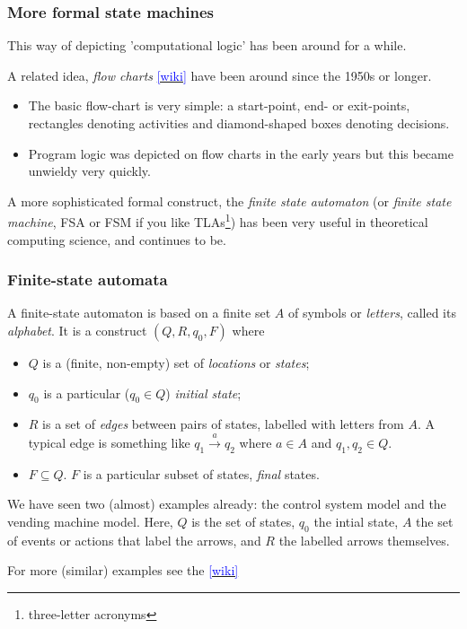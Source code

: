 \documentclass[10pt, hyperref={pdfpagelabels=false}]{beamer}
\begin{document}
\begin{frame}
\frametitle{More formal state machines}
This way of depicting 'computational logic' has been around for a while. 

A related idea, \emph{flow charts} \href{https://en.wikipedia.org/wiki/Flowchart}{\textcolor{blue}{[wiki]}} have been around since the 1950s or longer.
\begin{itemize}
\item The basic flow-chart is very simple: a start-point, end- or exit-points, rectangles denoting activities and diamond-shaped boxes denoting decisions.
\item Program logic was depicted on flow charts in the early years but this became unwieldy very quickly.
\end{itemize}

A more sophisticated formal construct, the \emph{finite state automaton} (or \emph{finite state machine}, FSA or FSM if you like TLAs\footnote{three-letter acronyms}) has been very useful in theoretical computing science, and continues to be.
\end{frame}

\begin{frame}
\frametitle{Finite-state automata}
A finite-state automaton is based on a finite set $A$ of symbols or \emph{letters}, called its \emph{alphabet}. It is a construct $(Q, R, q_0, F)$ where
\begin{itemize}
\item $Q$ is a (finite, non-empty) set of \emph{locations} or \emph{states};
\item $q_0$ is a particular ($q_0 \in Q$) \emph{initial state};
\item $R$ is a set of \emph{edges} between pairs of states, labelled with letters from $A$. A typical edge is something like $q_1 \stackrel{a}{\longrightarrow} q_2$ where $a \in A$ and $q_1, q_2 \in Q$.
\item $F \subseteq Q$. $F$ is a particular subset of states, \emph{final} states.
\end{itemize} 

We have seen two (almost) examples already: the control system model and the vending machine model. Here, $Q$ is the set of states, $q_0$ the intial state, $A$ the set of events or actions that label the arrows, and $R$ the labelled arrows themselves. 

For more (similar) examples see the \href{https://en.wikipedia.org/wiki/Finite-state_machine}{\textcolor{blue}{[wiki]}}
\end{frame}
\end{document}
